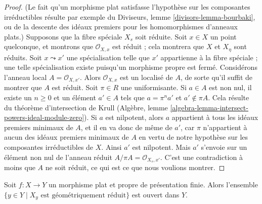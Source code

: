 \begin{proof}
(Le fait qu'un morphisme plat satisfasse l'hypothèse sur les composantes
irréductibles résulte par exemple du
Diviseurs, lemme \ref{divisors-lemma-bourbaki},
ou de la descente des idéaux premiers pour les homomorphismes d'anneaux plats.)
Supposons que la fibre spéciale $X_s$ soit réduite.
Soit $x \in X$ un point quelconque, et montrons que $\mathcal{O}_{X, x}$
est réduit ; cela montrera que $X$ et $X_\eta$ sont réduits.
Soit $x \leadsto x'$ une spécialisation telle que $x'$
appartienne à la fibre spéciale ; une telle spécialisation existe
puisqu'un morphisme propre est fermé. Considérons l'anneau local
$A = \mathcal{O}_{X, x'}$. Alors $\mathcal{O}_{X, x}$
est un localisé de $A$, de sorte qu'il suffit de montrer que
$A$ est réduit. Soit $\pi \in R$ une uniformisante.
Si $a \in A$ est non nul, il existe un $n \geq 0$ et un élément
$a' \in A$ tels que $a = \pi^n a'$ et $a' \not \in \pi A$.
Cela résulte du théorème d'intersection de Krull
(Algèbre, lemme \ref{algebra-lemma-intersect-powers-ideal-module-zero}).
Si $a$ est nilpotent, alors $a$ appartient à tous les idéaux premiers minimaux de $A$,
et il en va donc de même de $a'$, car $\pi$ n'appartient à aucun
des idéaux premiers minimaux de $A$ en vertu de notre hypothèse sur les composantes
irréductibles de $X$. Ainsi $a'$ est nilpotent.
Mais $a'$ s'envoie sur un élément non nul de l'anneau réduit
$A/\pi A = \mathcal{O}_{X_s, x'}$.
C'est une contradiction à moins que $A$ ne soit réduit, ce qui
est ce que nous voulions montrer.
\end{proof}

\begin{lemma}
\label{lemma-geometrically-reduced-open}
Soit $f : X \to Y$ un morphisme plat et propre de présentation finie.
Alors l'ensemble $\{y \in Y \mid X_y\text{ est géométriquement réduit}\}$
est ouvert dans $Y$.
\end{lemma}

